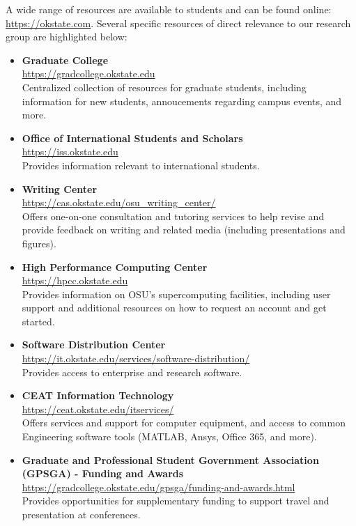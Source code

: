 \documentclass[12pt,a4paper,article,oneside]{memoir} %
\begin{document}
A wide range of resources are available to students and can be found online: \url{https://okstate.com}. Several specific resources of direct relevance to our research group are highlighted below:
\begin{itemize}
\item \textbf{Graduate College} \\ \url{https://gradcollege.okstate.edu} \\ Centralized collection of resources for graduate students, including information for new students, annoucements regarding campus events, and more.
\item \textbf{Office of International Students and Scholars} \\ \url{https://iss.okstate.edu} \\ Provides information relevant to international students.
\item \textbf{Writing Center} \\ \url{https://cas.okstate.edu/osu_writing_center/} \\ Offers one-on-one consultation and tutoring services to help revise and provide feedback on writing and related media (including presentations and figures).
\item \textbf{High Performance Computing Center} \\ \url{https://hpcc.okstate.edu} \\ Provides information on OSU's supercomputing facilities, including user support and additional resources on how to request an account and get started.
\item \textbf{Software Distribution Center } \\ \url{https://it.okstate.edu/services/software-distribution/} \\ Provides access to enterprise and research software.
\item \textbf{CEAT Information Technology} \\ \url{https://ceat.okstate.edu/itservices/} \\ Offers services and support for computer equipment, and access to common Engineering software tools (MATLAB, Ansys, Office 365, and more).
\item \textbf{Graduate and Professional Student Government Association (GPSGA) - Funding and Awards} \\ \url{https://gradcollege.okstate.edu/gpsga/funding-and-awards.html} \\ Provides opportunities for supplementary funding to support travel and presentation at conferences.
\end{itemize}
\end{document}
